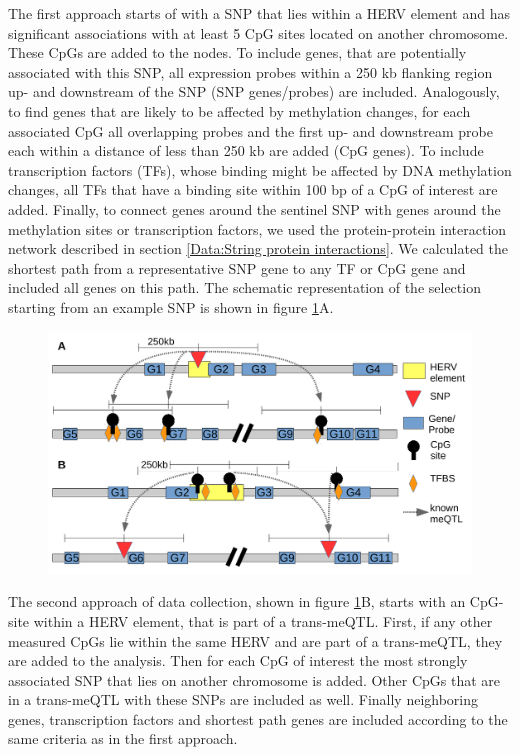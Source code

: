 \documentclass[a4paper,12pt,twoside,openright]{article}
\begin{document}
The first approach starts of with a SNP that lies within a HERV element and has significant associations with at least 5 CpG sites located on another chromosome. These CpGs are added to the nodes. To include genes, that are potentially associated with this SNP, all expression probes within a 250 kb flanking region up- and downstream of the SNP (SNP genes/probes) are included. Analogously, to find genes that are likely to be affected by methylation changes, for each associated CpG all overlapping probes and the first up- and downstream probe each within a distance of less than 250 kb are added (CpG genes). To include transcription factors (TFs), whose binding might be affected by DNA methylation changes, all TFs that have a binding site within 100 bp of a CpG of interest are added. Finally, to connect genes around the sentinel SNP with genes around the methylation sites or transcription factors, we used the protein-protein interaction network described in section \ref{Data:String protein interactions}. We calculated the shortest path from a representative SNP gene to any TF or CpG gene and included all genes on this path. The schematic representation of the selection starting from an example SNP is shown in figure \ref{fig:ggm.data.collect.scheme}A.

\begin{figure}[b!]
	\includegraphics[scale=0.75, keepaspectratio = true]{../figures/ggm_data_collect_scheme}
	\caption{}
	\label{fig:ggm.data.collect.scheme}
\end{figure}



The second approach of data collection, shown in figure \ref{fig:ggm.data.collect.scheme}B, starts with an CpG-site within a HERV element, that is part of a trans-meQTL. First, if any other measured CpGs lie within the same HERV and are part of a trans-meQTL, they are added to the analysis. Then for each CpG of interest the most strongly associated SNP that lies on another chromosome is added. Other CpGs that are in a trans-meQTL with these SNPs are included as well. Finally neighboring genes, transcription factors and shortest path genes are included according to the same criteria as in the first approach.
\end{document}

